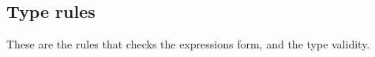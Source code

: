 	
	\subsection{Type rules}
	These are the rules that checks the expressions form, and the type validity.
	
	